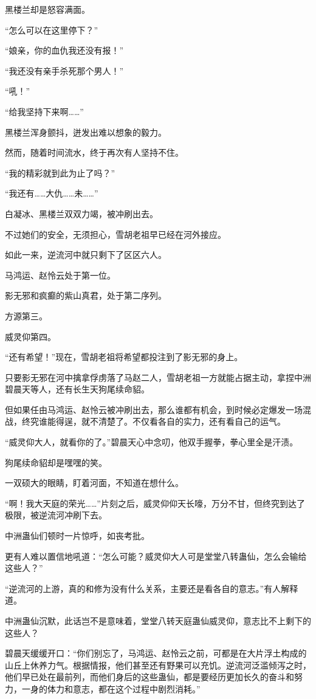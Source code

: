 \begin{this_body}
黑楼兰却是怒容满面。

“怎么可以在这里停下？”

“娘亲，你的血仇我还没有报！”

“我还没有亲手杀死那个男人！”

“吼！”

“给我坚持下来啊……”

黑楼兰浑身颤抖，迸发出难以想象的毅力。

然而，随着时间流水，终于再次有人坚持不住。

“我的精彩就到此为止了吗？”

“我还有……大仇……未……”

白凝冰、黑楼兰双双力竭，被冲刷出去。

不过她们的安全，无须担心，雪胡老祖早已经在河外接应。

如此一来，逆流河中就只剩下了区区六人。

马鸿运、赵怜云处于第一位。

影无邪和疯癫的紫山真君，处于第二序列。

方源第三。

威灵仰第四。

“还有希望！”现在，雪胡老祖将希望都投注到了影无邪的身上。

只要影无邪在河中擒拿俘虏落了马赵二人，雪胡老祖一方就能占据主动，拿捏中洲碧晨天等人，还有长生天狗尾续命貂。

但如果任由马鸿运、赵怜云被冲刷出去，那么谁都有机会，到时候必定爆发一场混战，终究谁能得逞，就不清楚了。不仅看各自的实力，还有看自己的运气。

“威灵仰大人，就看你的了。”碧晨天心中念叨，他双手握拳，拳心里全是汗渍。

狗尾续命貂却是嘿嘿的笑。

一双硕大的眼睛，盯着河面，不知道在想什么。

“啊！我大天庭的荣光……”片刻之后，威灵仰仰天长嚎，万分不甘，但终究到达了极限，被逆流河冲刷下去。

中洲蛊仙们顿时一片惊呼，如丧考批。

更有人难以置信地吼道：“怎么可能？威灵仰大人可是堂堂八转蛊仙，怎么会输给这些人？”

“逆流河的上游，真的和修为没有什么关系，主要还是看各自的意志。”有人解释道。

中洲蛊仙沉默，此话岂不是意味着，堂堂八转天庭蛊仙威灵仰，意志比不上剩下的这些人？

碧晨天缓缓开口：“你们别忘了，马鸿运、赵怜云之前，可都是在大片浮土构成的山丘上休养力气。根据情报，他们甚至还有野果可以充饥。逆流河泛滥倾泻之时，他们早已处在最前列，而他们身后的这些蛊仙，都是要经历更加长久的奋斗和努力，一身的体力和意志，都在这个过程中剧烈消耗。”


\end{this_body}
